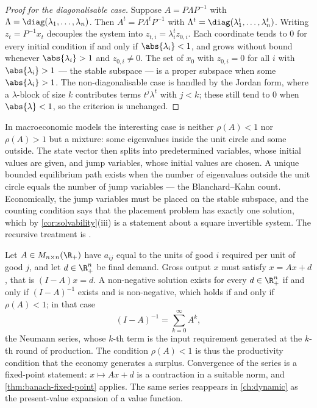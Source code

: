 \begin{proof}[Proof for the diagonalisable case]
	Suppose $A=P\Lambda P^{-1}$ with $\Lambda=\diag(\lambda_1,\dots,\lambda_n)$.
	Then $A^t=P\Lambda^tP^{-1}$ with
	$\Lambda^t=\diag(\lambda_1^t,\dots,\lambda_n^t)$. Writing
	$z_t=P^{-1}x_t$ decouples the system into $z_{t,i}=\lambda_i^tz_{0,i}$. Each
	coordinate tends to $0$ for every initial condition if and only if
	$\abs{\lambda_i}<1$, and grows without bound whenever $\abs{\lambda_i}>1$ and
	$z_{0,i}\neq0$. The set of $x_0$ with $z_{0,i}=0$ for all $i$ with
	$\abs{\lambda_i}>1$ --- the stable subspace --- is a proper subspace when some
	$\abs{\lambda_i}>1$. The non-diagonalisable case is handled by the Jordan form,
	where a $\lambda$-block of size $k$ contributes terms $t^{j}\lambda^{t}$ with
	$j<k$; these still tend to $0$ when $\abs{\lambda}<1$, so the criterion is
	unchanged.
\end{proof}

\begin{remark}\label{rem:saddle-path}
	In macroeconomic models the interesting case is neither $\rho(A)<1$ nor
	$\rho(A)>1$ but a mixture: some eigenvalues inside the unit circle and some
	outside. The state vector then splits into predetermined variables, whose
	initial values are given, and jump variables, whose initial values are chosen.
	A unique bounded equilibrium path exists when the number of eigenvalues outside
	the unit circle equals the number of jump variables --- the Blanchard--Kahn
	count. Economically, the jump variables must be placed on the stable subspace,
	and the counting condition says that the placement problem has exactly one
	solution, which by \autoref{cor:solvability}(iii) is a statement about a square
	invertible system. The recursive treatment is
	\textcite[Ch.~2]{ljungqvist2018recursive}.
\end{remark}

\begin{eg}\label{eg:leontief}
	Let $A\in M_{n\times n}(\R_+)$ have $a_{ij}$ equal to the units of good $i$
	required per unit of good $j$, and let $d\in\R^n_+$ be final demand. Gross
	output $x$ must satisfy $x=Ax+d$, that is $(I-A)x=d$. A non-negative solution
	exists for every $d\in\R^n_+$ if and only if $(I-A)^{-1}$ exists and is
	non-negative, which holds if and only if $\rho(A)<1$; in that case
	\[
		(I-A)^{-1}=\sum_{k=0}^{\infty}A^k,
	\]
	the Neumann series, whose $k$-th term is the input requirement generated at the
	$k$-th round of production. The condition $\rho(A)<1$ is thus the productivity
	condition that the economy generates a surplus. Convergence of the series is a
	fixed-point statement: $x\mapsto Ax+d$ is a contraction in a suitable norm, and
	\autoref{thm:banach-fixed-point} applies. The same series reappears in
	\autoref{ch:dynamic} as the present-value expansion of a value function.
\end{eg}

